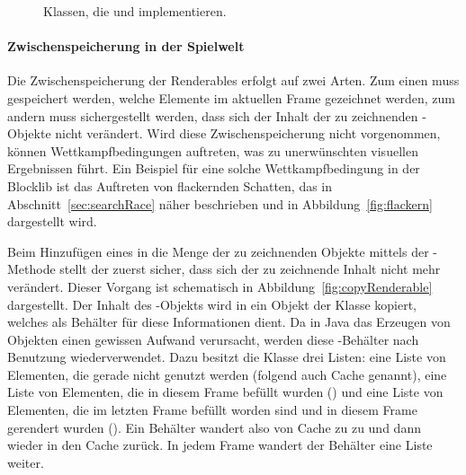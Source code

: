 \begin{figure}
	\centering
	
	\caption{Klassen, die \classDoubleBuffer{} und \classRenderer{} implementieren.}\label{fig:renderInterfaceDiagram}
\end{figure}

\paragraph{Zwischenspeicherung in der Spielwelt} Die Zwischenspeicherung der Renderables erfolgt auf zwei Arten. Zum einen muss gespeichert werden, welche Elemente im aktuellen Frame gezeichnet werden, zum andern muss sichergestellt werden, dass sich der Inhalt der zu zeichnenden \classRenderable{}-Objekte nicht verändert. Wird diese Zwischenspeicherung nicht vorgenommen, können Wettkampfbedingungen auftreten, was zu unerwünschten visuellen Ergebnissen führt. Ein Beispiel für eine solche Wettkampfbedingung in der Blocklib ist das Auftreten von flackernden Schatten, das in Abschnitt~\ref{sec:searchRace} näher beschrieben und in Abbildung~\ref{fig:flackern} dargestellt wird.

Beim Hinzufügen eines \classRenderable{} in die Menge der zu zeichnenden Objekte mittels der -Methode stellt der \classMasterRenderer{} zuerst sicher, dass sich der zu zeichnende Inhalt nicht mehr verändert. Dieser Vorgang ist schematisch in Abbildung~\ref{fig:copyRenderable} dargestellt. Der Inhalt des \classRenderable{}-Objekts wird in ein Objekt der Klasse \classRenderedRenderable{} kopiert, welches als Behälter für diese Informationen dient. Da in Java das Erzeugen von Objekten einen gewissen Aufwand verursacht, werden diese \classRenderedRenderable{}-Behälter nach Benutzung wiederverwendet. Dazu besitzt die Klasse \classMasterRenderer{} drei Listen: eine Liste von Elementen, die gerade nicht genutzt werden (folgend auch Cache genannt), eine Liste von Elementen, die in diesem Frame befüllt wurden () und eine Liste von Elementen, die im letzten Frame befüllt worden sind und in diesem Frame gerendert wurden (). Ein Behälter wandert also von Cache zu  zu  und dann wieder in den Cache zurück. In jedem Frame wandert der Behälter eine Liste weiter.

